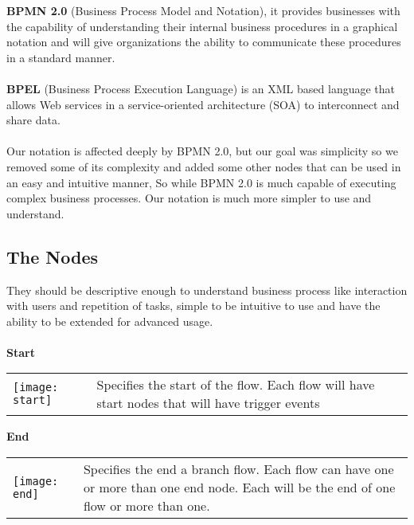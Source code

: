 \textbf{BPMN 2.0} \cite{OMG-BPMN} (Business Process Model and Notation), it provides
businesses with the capability of understanding their internal business procedures in a graphical
notation and will give organizations the ability to communicate these procedures in a standard
manner.\\\\
\textbf{BPEL} \cite{OASIS-BPEL} (Business Process Execution Language) is an XML based language that allows Web services
in a service-oriented architecture (SOA) to interconnect and share data.\\\\
Our notation is affected deeply by BPMN 2.0, but our goal was simplicity so we removed some of its
complexity and added some other nodes that can be used in an easy and intuitive manner, So while
BPMN 2.0 is much capable of executing complex business processes. Our notation is much more
simpler to use and understand.

\subsection{The Nodes}
They should be descriptive enough to understand business process like interaction with users and
repetition of tasks, simple to be intuitive to use and have the ability to be extended for advanced
usage. \\\\

\large \textbf{Start}\\

\begin{tabular}{C{2.2cm}  L{10cm}}
    \texttt{[image: start]} & Specifies the start of the flow.\newline 
    Each flow will have start nodes that will have trigger events\newline
\end{tabular}

\break

\large \textbf{End}\\

\begin{tabular}{C{2.2cm}  L{10cm}}
    \texttt{[image: end]} & Specifies the end a branch flow.
    \newline Each flow can have one or more than one end node.
    \newline Each will be the end of one flow or more than one.

\end{tabular}

